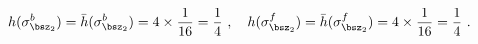 \begin{equation}
h(\sigma_{\bsz_2}^{b})= \bar{h}(\sigma_{\bsz_2}^{b})
= 4\times \frac{1}{16}=\frac{1}{4}~,~~~
h(\sigma_{\bsz_2}^{f})= \bar{h}(\sigma_{\bsz_2}^{f})
= 4\times \frac{1}{16}=\frac{1}{4}~.
\end{equation}

